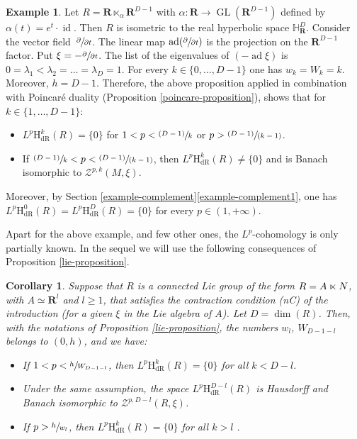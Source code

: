 \documentclass[JEP,XML,SOM,Unicode,published]{cedram}
\newcommand{\psfrac}[2]{\sfrac{(#1)}{#2}}
\newcommand{\pspfrac}[2]{\sfrac{(#1)}{(#2)}}
\newcommand{\dR}{\mathrm{dR}}
\newcommand{\rH}{\mathrm{H}}
\newcommand{\RR}{\mathbf{R}}
\theoremstyle{plain}
\newtheorem{corollary}[equation]{Corollary}
\theoremstyle{remark}
\theoremstyle{definition}
\newtheorem{example}[equation]{Example}
\DeclareMathOperator{\ad}{ad}
\DeclareMathOperator{\GL}{GL}
\DeclareMathOperator{\id}{id}
\begin{document}
\begin{example}
Let $R = \RR \ltimes_\alpha \RR^{D-1}$ with $\alpha: \RR \to \GL(\RR^{D-1})$ defined by
$\alpha (t) = e^t \cdot \id$.
Then $R$ is isometric to the real hyperbolic space $\mathbb H^D_\RR$. Consider the vector field~$\sfrac{\partial}{\partial t}$. The
linear map $\ad(\sfrac{\partial}{\partial t})$ is the projection on the $\RR^{D-1}$ factor.
Put $\xi = -\sfrac{\partial}{\partial t}$. The list of the eigenvalues of
$(-\ad\xi)$ is $0= \lambda_1 < \lambda_2 = \dots = \lambda_D =1$. For every
$k \in \{0, \dots , D-1\}$
one has $w_k = W_k = k$. Moreover, $h = D-1$. Therefore, the above proposition applied in combination with Poincaré duality (Proposition \ref{poincare-proposition}), shows that for $k\in \{1, \dots , D-1\}$:
\begin{itemize}
\item $L^p \rH^k_\dR(R) =\{0\}$ for $1< p<\psfrac{D-1}{k}$ or $p>\pspfrac{D-1}{k-1}$.
\item If $\psfrac{D-1}{k}<p <\pspfrac{D-1}{k-1}$, then $L^p \rH^{k}_\dR(R) \neq \{0\}$ and is Banach isomorphic to
$\mathcal Z^{p,k}(M, \xi)$.
\end{itemize}
Moreover, by Section \ref{example-complement}\eqref{example-complement1}, one has $L^p \rH^0_\dR(R) \!=\! L^p \rH^D_\dR(R) \!=\!\{0\}$ for every $p\!\in\!(1, +\infty)$.
\end{example}

Apart for the above example, and few other ones, the $L^p$\nobreakdash-cohomology is only partially known.
In the sequel we will use the following consequences of Proposition \ref{lie-proposition}.

\begin{corollary}
\label{lie-corollary1}
Suppose that $R$ is a connected Lie group of the form $R = A \ltimes\nobreak N$, with $A \simeq \RR^l$ and $l \geqslant 1$, that satisfies the contraction condition (nC) of the introduction (for a given $\xi$ in the Lie algebra of $A$). Let $D =\dim(R)$.
Then, with the notations of Proposition \ref{lie-proposition}, the numbers $w_{l}$, $W_{D-1-l}$ belongs to $(0, h)$, and we have:
\begin{itemize}
\item If $1<p<\sfrac{h}{W_{D-1-l}}$, then $L^p \rH^k_\dR(R) = \{0\}$ for all $k < D-l$.
\item Under the same assumption, the space $L^p \rH^{D-l}_\dR(R)$ is Hausdorff and Banach isomorphic to $\mathcal Z^{p, D-l}(R, \xi)$.
\item If $p > \sfrac{h}{w_{l}}$, then $L^p \rH^k_\dR(R) =\{0\}$ for all $k > l$ .
\end{itemize}
\end{corollary}
\end{document}

